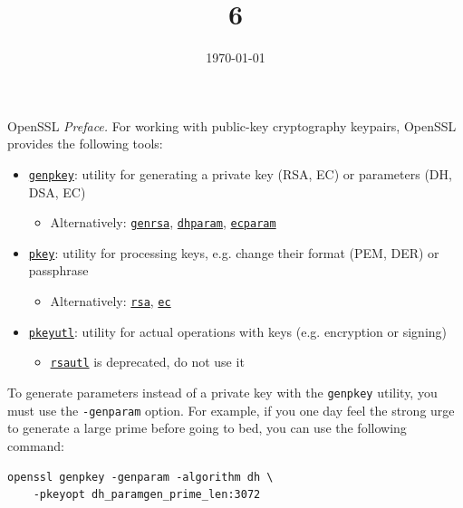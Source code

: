 \documentclass{practice}
\title{6}
\date{\today}
\begin{document}
\maketitle

\begin{task}{OpenSSL}
  \textit{Preface.}
  For working with public-key cryptography keypairs, OpenSSL provides the following tools:
  \begin{itemize}
    \item \href{https://docs.openssl.org/master/man1/openssl-genpkey/}{\texttt{genpkey}}: utility for generating a private key (RSA, EC) or parameters (DH, DSA, EC)
    \begin{itemize}
      \item Alternatively: \href{https://docs.openssl.org/master/man1/openssl-genrsa/}{\texttt{genrsa}}, \href{https://docs.openssl.org/master/man1/openssl-dhparam/}{\texttt{dhparam}}, \href{https://docs.openssl.org/master/man1/openssl-ecparam/}{\texttt{ecparam}}
    \end{itemize}
    \item \href{https://docs.openssl.org/master/man1/openssl-pkey/}{\texttt{pkey}}: utility for processing keys, e.g. change their format (PEM, DER) or passphrase
    \begin{itemize}
      \item Alternatively: \href{https://docs.openssl.org/master/man1/openssl-rsa/}{\texttt{rsa}}, \href{https://docs.openssl.org/master/man1/openssl-ec}{\texttt{ec}}
    \end{itemize}
    \item \href{https://docs.openssl.org/master/man1/openssl-pkeyutl/}{\texttt{pkeyutl}}: utility for actual operations with keys (e.g. encryption or signing)
    \begin{itemize}
      \item \href{https://docs.openssl.org/master/man1/openssl-rsautl/}{\texttt{rsautl}} is deprecated, do not use it
    \end{itemize}
  \end{itemize}

  To generate parameters instead of a private key with the \texttt{genpkey} utility, you must use the \texttt{-genparam} option.
  For example, if you one day feel the strong urge to generate a large prime before going to bed, you can use the following command:
  \begin{Verbatim}
openssl genpkey -genparam -algorithm dh \
    -pkeyopt dh_paramgen_prime_len:3072
  \end{Verbatim}


\end{task}
\end{document}
